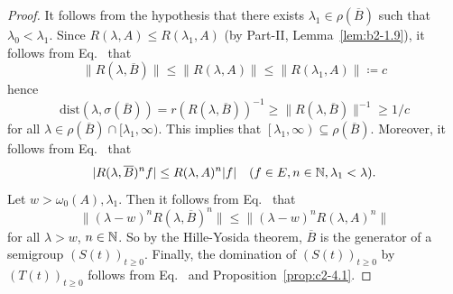 \begin{proof}
It follows from the hypothesis that there exists $\lambda_{1} \in \rho(\overline{B})$ such that $\lambda_{0} < \lambda_{1}$. 
Since $R(\lambda,A) \leq R(\lambda_{1},A)$ (by Part-II, Lemma~\ref{lem:b2-1.9}), it follows from Eq.~ that 
%
\[
	\|R(\lambda,\overline{B})\| \leq \|R(\lambda,A)\| \leq \|R(\lambda_{1},A)\| \coloneq c  
\]
%
hence 
%
\[
	\text{dist}(\lambda,\sigma(\overline{B})) = r(R(\lambda,\overline{B}))^{-1} \geq \|R(\lambda,\overline{B})\|^{-1} \geq 1/c 
\]
%
for all $\lambda \in \rho(\overline{B}) \cap [\lambda_{1},\infty)$. 
This implies that $\left[\lambda_{1},\infty\right) \subseteq \rho(\overline{B})$. Moreover, it follows from Eq.~ that
\begin{equation}\label{eq:c2-4.9}
|R(\lambda,\overline{B})^{n}f| \leq R(\lambda,A)^{n}|f| \quad (f \in E, n \in \N , \lambda_{1} < \lambda).
\end{equation}
Let $w > \omega_{0}(A), \lambda_{1}$. 
Then it follows from Eq.~ that 
%
\[
	\|(\lambda - w)^{n}R(\lambda,\overline{B})^{n}\| \leq \|(\lambda - w)^{n}R(\lambda,A)^{n}\| 
\]
%
for all $\lambda > w$, $n \in \mathbb{N} $. 
So by the Hille-Yosida theorem, $\overline{B}$ is the generator of a semigroup $(S(t))_{t \geq 0}$. 
Finally, the domination of\/ $(S(t))_{t \geq 0}$ by $(T(t))_{t \geq 0}$ follows from Eq.~ and  Proposition~\ref{prop:c2-4.1}.
\end{proof}
